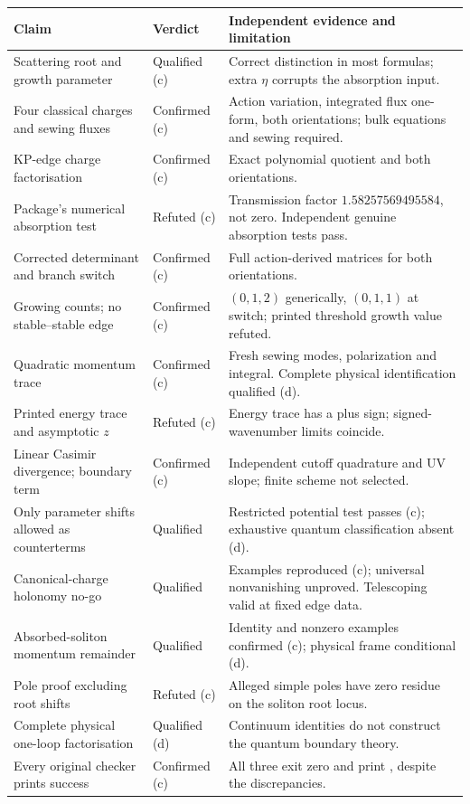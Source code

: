 \documentclass[11pt,a4paper]{article}
\newcommand{\file}[1]{\texttt{\detokenize{#1}}}
\begin{document}
\begin{longtable}{@{}L{5.1cm}L{2.3cm}L{7.9cm}@{}}
\toprule Claim & Verdict & Independent evidence and limitation\\\midrule\endhead
Scattering root and growth parameter & Qualified (c) & Correct distinction in most formulas; extra $\eta$ corrupts the absorption input.\\
Four classical charges and sewing fluxes & Confirmed (c) & Action variation, integrated flux one-form, both orientations; bulk equations and sewing required.\\
KP-edge charge factorisation & Confirmed (c) & Exact polynomial quotient and both orientations.\\
Package's numerical absorption test & Refuted (c) & Transmission factor $1.58257569495584$, not zero. Independent genuine absorption tests pass.\\
Corrected determinant and branch switch & Confirmed (c) & Full action-derived matrices for both orientations.\\
Growing counts; no stable--stable edge & Confirmed (c) & $(0,1,2)$ generically, $(0,1,1)$ at switch; printed threshold growth value refuted.\\
Quadratic momentum trace & Confirmed (c) & Fresh sewing modes, polarization and integral. Complete physical identification qualified (d).\\
Printed energy trace and asymptotic $z$ & Refuted (c) & Energy trace has a plus sign; signed-wavenumber limits coincide.\\
Linear Casimir divergence; boundary term & Confirmed (c) & Independent cutoff quadrature and UV slope; finite scheme not selected.\\
Only parameter shifts allowed as counterterms & Qualified & Restricted potential test passes (c); exhaustive quantum classification absent (d).\\
Canonical-charge holonomy no-go & Qualified & Examples reproduced (c); universal nonvanishing unproved. Telescoping valid at fixed edge data.\\
Absorbed-soliton momentum remainder & Qualified & Identity and nonzero examples confirmed (c); physical frame conditional (d).\\
Pole proof excluding root shifts & Refuted (c) & Alleged simple poles have zero residue on the soliton root locus.\\
Complete physical one-loop factorisation & Qualified (d) & Continuum identities do not construct the quantum boundary theory.\\
Every original checker prints success & Confirmed (c) & All three exit zero and print \file{ALL CHECKS PASSED}, despite the discrepancies.\\\bottomrule
\end{longtable}
\end{document}
